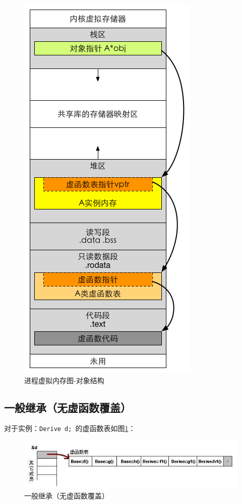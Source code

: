 \documentclass[UTF8,a4paper,12pt]{ctexbook} %
\begin{document}
	       \begin{figure}[H]
		       	\centering
		       	\includegraphics[scale=0.8]{process.png}
		       	\caption{进程虚拟内存图-对象结构}
      	    \end{figure}
       
	      \subsection{一般继承（无虚函数覆盖）}
		      对于实例：\verb|Derive d;| 的虚函数表如图\ref{vir-no}：
		      
			      \begin{figure}[H]
			      	\centering
			      	\includegraphics[scale=0.8]{vt-base.jpg}
			      	\caption{一般继承（无虚函数覆盖）\label{vir-no}}
			      \end{figure}
			     
\end{document}

